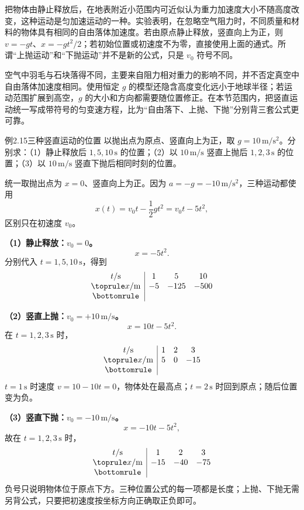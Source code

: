 把物体由静止释放后，在地表附近小范围内可近似认为重力加速度大小不随高度改变，这种运动是匀加速运动的一种。实验表明，在忽略空气阻力时，不同质量和材料的物体具有相同的自由落体加速度。若由原点静止释放，竖直向上为正，则 $v=-gt$、$x=-gt^2/2$；若初始位置或初速度不为零，直接使用上面的通式。所谓“上抛运动”和“下抛运动”并不是新的公式，只是 $v_0$ 符号不同。

空气中羽毛与石块落得不同，主要来自阻力相对重力的影响不同，并不否定真空中自由落体加速度相同。使用恒定 $g$ 的模型还隐含高度变化远小于地球半径；若运动范围扩展到高空，$g$ 的大小和方向都需要随位置修正。在本节范围内，把竖直运动统一写成带符号的匀变速方程，比为“自由落下、上抛、下抛”分别背三套公式更可靠。

\begin{origexamplebox}{例2.15\quad 三种竖直运动的位置}
以抛出点为原点、竖直向上为正，取 $g=10\,\mathrm{m/s^2}$。分别求：（1）静止释放后 $1,5,10\,\mathrm s$ 的位置；（2）以 $10\,\mathrm{m/s}$ 竖直上抛后 $1,2,3\,\mathrm s$ 的位置；（3）以 $10\,\mathrm{m/s}$ 竖直下抛后相同时刻的位置。
\end{origexamplebox}
\begin{xesolution}
统一取抛出点为 $x=0$、竖直向上为正。因为 $a=-g=-10\,\mathrm{m/s^2}$，三种运动都使用
\[
x(t)=v_0t-\frac12gt^2=v_0t-5t^2,
\]
区别只在初速度 $v_0$。

\textbf{（1）静止释放：$v_0=0$。}
\[
x=-5t^2.
\]
分别代入 $t=1,5,10\,\mathrm s$，得到
\[
\begin{array}{c|ccc}
t/\mathrm{s}&1&5&10\\\toprule
 x/\mathrm m&-5&-125&-500\\\bottomrule
\end{array}
\]

\textbf{（2）竖直上抛：$v_0=+10\,\mathrm{m/s}$。}
\[
x=10t-5t^2.
\]
在 $t=1,2,3\,\mathrm s$ 时，
\[
\begin{array}{c|ccc}
t/\mathrm{s}&1&2&3\\\toprule
x/\mathrm m&5&0&-15\\\bottomrule
\end{array}
\]
$t=1\,\mathrm s$ 时速度 $v=10-10t=0$，物体处在最高点；$t=2\,\mathrm s$ 时回到原点；随后位置变为负。

\textbf{（3）竖直下抛：$v_0=-10\,\mathrm{m/s}$。}
\[
x=-10t-5t^2,
\]
故在 $t=1,2,3\,\mathrm s$ 时，
\[
\begin{array}{c|ccc}
t/\mathrm{s}&1&2&3\\\toprule
x/\mathrm m&-15&-40&-75\\\bottomrule
\end{array}
\]
负号只说明物体位于原点下方。三种位置公式的每一项都是长度；上抛、下抛无需另背公式，只要把初速度按坐标方向正确取正负即可。
\end{xesolution}

